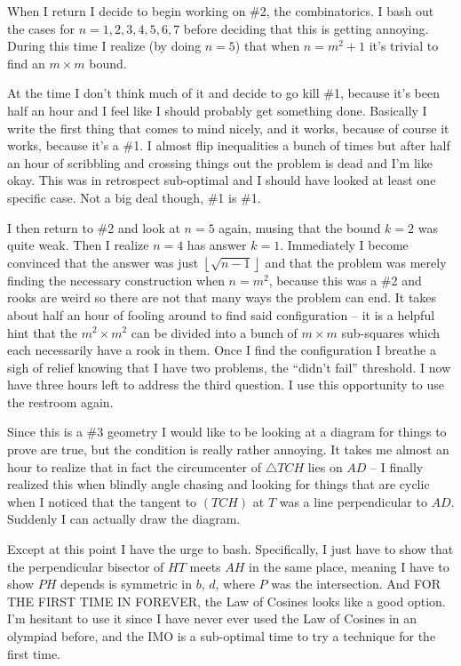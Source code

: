 \documentclass[11pt]{scrreprt}
\numberwithin{figure}{chapter}
\begin{document}
When I return I decide to begin working on \#2, the combinatorics.
I bash out the cases for $n=1,2,3,4,5,6,7$ before deciding that this is getting annoying.
During this time I realize (by doing $n=5$) that when $n=m^2+1$ it's trivial to find an $m \times m$ bound.

At the time I don't think much of it and decide to go kill \#1, because it's been half an hour and I feel like I should probably get something done.
Basically I write the first thing that comes to mind nicely, and it works, because of course it works, because it's a \#1. I almost flip inequalities
a bunch of times but after half an hour of scribbling and crossing things out the problem is dead and I'm like okay.
This was in retrospect sub-optimal and I should have looked at least one specific case.
Not a big deal though, \#1 is \#1.

I then return to \#2 and look at $n=5$ again, musing that the bound $k=2$ was quite weak.
Then I realize $n=4$ has answer $k=1$.
Immediately I become convinced that the answer was just $\left\lfloor \sqrt{n-1} \right\rfloor$ and that the problem was merely
finding the necessary construction when $n=m^2$, because this was a \#2 and rooks are weird so there are not that many ways
the problem can end.
It takes about half an hour of fooling around to find said configuration -- it is a helpful hint that the $m^2 \times m^2$ can be
divided into a bunch of $m \times m$ sub-squares which each necessarily have a rook in them.
Once I find the configuration I breathe a sigh of relief knowing that I have two problems, the ``didn't fail'' threshold.
I now have three hours left to address the third question.
I use this opportunity to use the restroom again.

Since this is a \#3 geometry I would like to be looking at a diagram for things to prove are true, but the condition is really rather annoying.
It takes me almost an hour to realize that in fact the circumcenter of $\triangle TCH$ lies on $AD$ -- I finally realized this when blindly
angle chasing and looking for things that are cyclic when I noticed that the tangent to $(TCH)$ at $T$ was a line perpendicular to $AD$.
Suddenly I can actually draw the diagram.

Except at this point I have the urge to bash. Specifically, I just have to show that the perpendicular bisector of $HT$ meets $AH$ in the same place, meaning I have to show $PH$ depends is symmetric in $b$, $d$, where $P$ was the intersection.
And FOR THE FIRST TIME IN FOREVER, the Law of Cosines looks like a good option.
I'm hesitant to use it since I have never ever used the Law of Cosines in an olympiad before, and the IMO is a sub-optimal time to try a technique for the first time.
\end{document}
